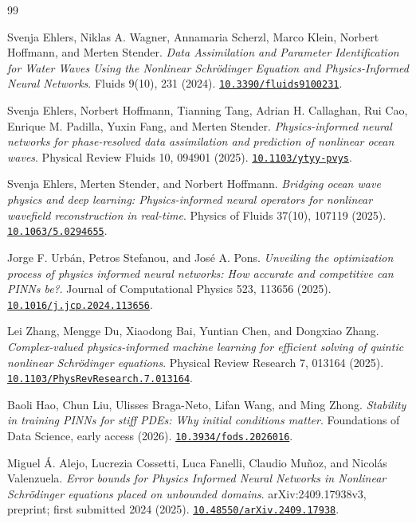 \begin{thebibliography}{99}
\setlength{\itemsep}{0.6em}

Svenja Ehlers, Niklas A. Wagner, Annamaria Scherzl, Marco Klein, Norbert Hoffmann, and Merten Stender.
\emph{Data Assimilation and Parameter Identification for Water Waves Using the Nonlinear Schr\"{o}dinger Equation and Physics-Informed Neural Networks}.
Fluids 9(10), 231 (2024).
\href{https://doi.org/10.3390/fluids9100231}{\nolinkurl{10.3390/fluids9100231}}.

Svenja Ehlers, Norbert Hoffmann, Tianning Tang, Adrian H. Callaghan, Rui Cao, Enrique M. Padilla, Yuxin Fang, and Merten Stender.
\emph{Physics-informed neural networks for phase-resolved data assimilation and prediction of nonlinear ocean waves}.
Physical Review Fluids 10, 094901 (2025).
\href{https://doi.org/10.1103/ytyy-pvys}{\nolinkurl{10.1103/ytyy-pvys}}.

Svenja Ehlers, Merten Stender, and Norbert Hoffmann.
\emph{Bridging ocean wave physics and deep learning: Physics-informed neural operators for nonlinear wavefield reconstruction in real-time}.
Physics of Fluids 37(10), 107119 (2025).
\href{https://doi.org/10.1063/5.0294655}{\nolinkurl{10.1063/5.0294655}}.

Jorge F. Urb\'{a}n, Petros Stefanou, and Jos\'{e} A. Pons.
\emph{Unveiling the optimization process of physics informed neural networks: How accurate and competitive can PINNs be?}.
Journal of Computational Physics 523, 113656 (2025).
\href{https://doi.org/10.1016/j.jcp.2024.113656}{\nolinkurl{10.1016/j.jcp.2024.113656}}.

Lei Zhang, Mengge Du, Xiaodong Bai, Yuntian Chen, and Dongxiao Zhang.
\emph{Complex-valued physics-informed machine learning for efficient solving of quintic nonlinear Schr\"{o}dinger equations}.
Physical Review Research 7, 013164 (2025).
\href{https://doi.org/10.1103/PhysRevResearch.7.013164}{\nolinkurl{10.1103/PhysRevResearch.7.013164}}.

Baoli Hao, Chun Liu, Ulisses Braga-Neto, Lifan Wang, and Ming Zhong.
\emph{Stability in training PINNs for stiff PDEs: Why initial conditions matter}.
Foundations of Data Science, early access (2026).
\href{https://doi.org/10.3934/fods.2026016}{\nolinkurl{10.3934/fods.2026016}}.

Miguel \'{A}. Alejo, Lucrezia Cossetti, Luca Fanelli, Claudio Mu\~{n}oz, and Nicol\'{a}s Valenzuela.
\emph{Error bounds for Physics Informed Neural Networks in Nonlinear Schr\"{o}dinger equations placed on unbounded domains}.
arXiv:2409.17938v3, preprint; first submitted 2024 (2025).
\href{https://doi.org/10.48550/arXiv.2409.17938}{\nolinkurl{10.48550/arXiv.2409.17938}}.


\end{thebibliography}
